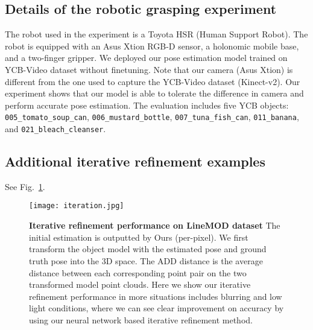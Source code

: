 \documentclass[10pt,twocolumn,letterpaper]{article}
\begin{document}
\subsection{Details of the robotic grasping experiment}
The robot used in the experiment is a Toyota HSR (Human Support Robot). The robot is equipped with an Asus Xtion RGB-D sensor, a holonomic mobile base, and a two-finger gripper. We deployed our pose estimation model trained on YCB-Video dataset without finetuning. Note that our camera (Asus Xtion) is different from the one used to capture the YCB-Video dataset (Kinect-v2). Our experiment shows that our model is able to tolerate the difference in camera and perform accurate pose estimation. The evaluation includes five YCB objects: \texttt{005\_tomato\_soup\_can}, \texttt{006\_mustard\_bottle}, \texttt{007\_tuna\_fish\_can}, \texttt{011\_banana}, and \texttt{021\_bleach\_cleanser}. 


\subsection{Additional iterative refinement examples}
See Fig.~\ref{exp:supp_iterative}.

\begin{figure}[h]
	\centering
	\texttt{[image: iteration.jpg]}
	\caption{\textbf{Iterative refinement performance on LineMOD dataset} The initial estimation is outputted by Ours (per-pixel). We first transform the object model with the estimated pose and ground truth pose into the 3D space. The ADD distance is the average distance between each corresponding point pair on the two transformed model point clouds. Here we show our iterative refinement performance in more situations includes blurring and low light conditions, where we can see clear improvement on accuracy by using our neural network based iterative refinement method.}
	\label{exp:supp_iterative}
\end{figure}
\end{document}
